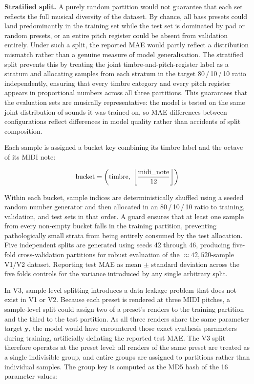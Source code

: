 \noindent{}

\noindent\textbf{Stratified split.} A purely random partition would not guarantee that each set reflects the full musical diversity of the dataset. By chance, all bass presets could land predominantly in the training set while the test set is dominated by pad or random presets, or an entire pitch register could be absent from validation entirely. Under such a split, the reported MAE would partly reflect a distribution mismatch rather than a genuine measure of model generalisation. The stratified split prevents this by treating the joint timbre-and-pitch-register label as a stratum and allocating samples from each stratum in the target 80\,/\,10\,/\,10 ratio independently, ensuring that every timbre category and every pitch register appears in proportional numbers across all three partitions. This guarantees that the evaluation sets are musically representative: the model is tested on the same joint distribution of sounds it was trained on, so MAE differences between configurations reflect differences in model quality rather than accidents of split composition.

Each sample is assigned a bucket key combining its timbre label and the octave of its MIDI note:

\begin{equation}
\text{bucket} = \left(\text{timbre},\; \left\lfloor \frac{\text{midi\_note}}{12} \right\rfloor\right)
\label{eq:bucket}\eqname{Stratification bucket key}
\end{equation}

\noindent Within each bucket, sample indices are deterministically shuffled using a seeded random number generator and then allocated in an 80\,/\,10\,/\,10 ratio to training, validation, and test sets in that order. A guard ensures that at least one sample from every non-empty bucket falls in the training partition, preventing pathologically small strata from being entirely consumed by the test allocation. Five independent splits are generated using seeds 42 through 46, producing five-fold cross-validation partitions for robust evaluation of the $\approx 42{,}520$-sample V1/V2 dataset. Reporting test MAE as mean $\pm$ standard deviation across the five folds controls for the variance introduced by any single arbitrary split.

\par \vspace{0.3cm}
In V3, sample-level splitting introduces a data leakage problem that does not exist in V1 or V2. Because each preset is rendered at three MIDI pitches, a sample-level split could assign two of a preset's renders to the training partition and the third to the test partition. As all three renders share the same parameter target $\mathbf{y}$, the model would have encountered those exact synthesis parameters during training, artificially deflating the reported test MAE. The V3 split therefore operates at the preset level: all renders of the same preset are treated as a single indivisible group, and entire groups are assigned to partitions rather than individual samples. The group key is computed as the MD5 hash of the 16 parameter values:

